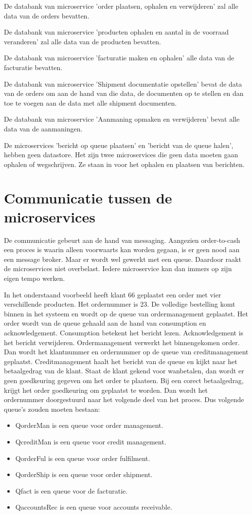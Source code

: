 De databank van microservice 'order plaatsen, ophalen en verwijderen' zal alle data van de orders bevatten.

De databank van microservice 'producten ophalen en aantal in de voorraad veranderen' zal alle data van de producten bevatten.

De databank van microservice 'facturatie maken en ophalen' alle data van de facturatie bevatten.

De databank van microservice 'Shipment documentatie opstellen' bevat de data van de orders om aan de hand van die data, de documenten op te stellen en dan toe te voegen aan de data met alle shipment documenten.

De databank van microservice 'Aanmaning opmaken en verwijderen' bevat alle data van de aanmaningen. 

De microservices 'bericht op queue plaatsen' en 'bericht van de queue halen', hebben geen datastore. Het zijn twee microservices die geen data moeten gaan ophalen of wegschrijven. Ze staan in voor het ophalen en plaatsen van berichten. 

\section{Communicatie tussen de microservices}
De communicatie gebeurt aan de hand van messaging. Aangezien order-to-cash een proces is waarin alleen voorwaarts kan worden gegaan, is er geen nood aan een message broker. Maar er wordt wel gewerkt met een queue. Daardoor raakt de microservices niet overbelast. Iedere microservice kan dan immers op zijn eigen tempo werken.
 
In het onderstaand voorbeeld heeft klant 66 geplaatst een order met vier verschillende producten. Het ordernummer is 23. De volledige bestelling komt binnen in het systeem en wordt op de queue van ordermanagement geplaatst. Het order wordt van de queue gehaald aan de hand van consumption en acknowledgement. Consumption betekent het bericht lezen. Acknowledgement is het bericht verwijderen. Ordermanagement verwerkt het binnengekomen order. Dan wordt het klantnummer en ordernummer op de queue van creditmanagement geplaatst. Creditmanagement haalt het bericht van de queue en kijkt naar het betaalgedrag van de klant. Staat de klant gekend voor wanbetalen, dan wordt er geen goedkeuring gegeven om het order te plaatsen. Bij een corect betaalgedrag, krijgt het order goedkeuring om geplaatst te worden. Dan wordt het ordernummer doorgestuurd naar het volgende deel van het proces. 
Dus volgende queue's zouden moeten bestaan:
\begin{itemize}
	\item QorderMan is een queue voor order management.
	\item QcreditMan is een queue voor credit management.
	\item QorderFul is een queue voor order fulfilment.
	\item QorderShip is een queue voor order shipment.
	\item Qfact is een queue voor de facturatie.
	\item QaccountsRec is een queue voor accounts receivable. 
\end{itemize}

